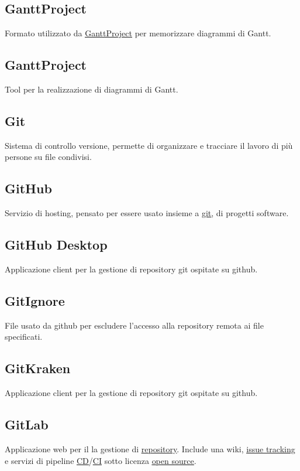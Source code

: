 	\subsection{GanttProject}
	\label{sec:ganttproject}	
	Formato utilizzato da \underline{\hyperref[sec:ganttproject]{GanttProject}} per memorizzare diagrammi di Gantt. 
	\subsection{GanttProject}
	\label{sec:ganttproject}
	Tool per la realizzazione di diagrammi di Gantt.

	\subsection{Git}
	\label{sec:git}
	Sistema di controllo versione, permette di organizzare e tracciare il lavoro di più persone su file condivisi.

	\subsection{GitHub}
	\label{sec:github}
	Servizio di hosting, pensato per essere usato insieme a \underline{\hyperref[sec:git]{git}}, di progetti software.

	\subsection{GitHub Desktop}
	\label{sec:github}
	Applicazione client per la gestione di repository git ospitate su github.

	\subsection{GitIgnore}
	\label{sec:github}
	File usato da github per escludere l'accesso alla repository remota ai file specificati.

	\subsection{GitKraken}
	\label{sec:gitkraken}
	Applicazione client per la gestione di repository git ospitate su github.

	\subsection{GitLab}
	\label{sec:gitlab}
	Applicazione web per il la gestione di \underline{\hyperref[sec:repo]{repository}}. Include una wiki, \underline{\hyperref[sec:issuetrack]{issue tracking}} e servizi di pipeline \underline{\hyperref[sec:continuousdelivery]{CD}}/\underline{\hyperref[sec:continuousintegration]{CI}} sotto licenza \underline{\hyperref[sec:opensource]{open source}}.

